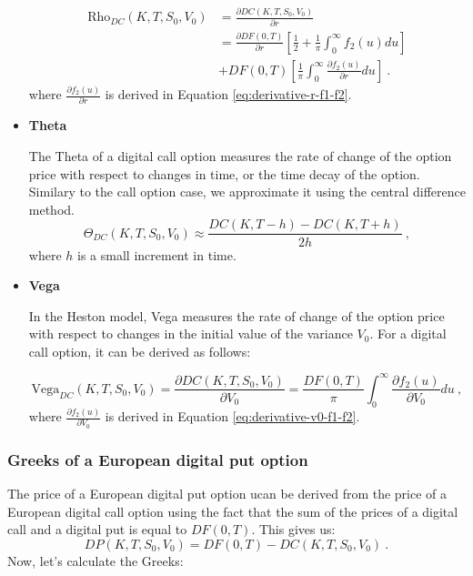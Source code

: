 \begin{itemize}
$$
\begin{aligned}
\text{Rho}_{DC}(K,T,S_0,V_0) &= 
\frac{ \partial DC(K,T, S_0, V_0) }{\partial r} 
\\ &=
\frac{\partial DF(0,T)}{\partial r}  \left[ \frac{1}{2} + \frac{1}{\pi}\int_0^{\infty}f_2(u) du \right]  
\\
&+
 DF(0,T)  \left[\frac{1}{\pi}\int_0^{\infty} \frac{ \partial f_2(u)}{\partial r}  du \right] \ .
\end{aligned}
$$
where $\frac{\partial f_2(u)}{\partial r}$ is derived in Equation \ref{eq:derivative-r-f1-f2}.




\item \textbf{Theta} 

The Theta of a digital call option measures the rate of change of the option price with respect to changes in time, or the time decay of the option. Similary to the call option case, we approximate it using the central difference method. 
$$
 \Theta_{DC}(K,T,S_0,V_0) \approx \frac{DC(K,T-h) - DC(K,T+h)}{2h} \  ,
$$
where $h$ is a small increment in time. 


\item \textbf{Vega} 

In the Heston model, Vega measures the rate of change of the option price with respect to changes in the initial value of the variance $V_0$. For a digital call option, it can be derived as follows:

$$
\text{Vega}_{DC}(K,T,S_0,V_0) = \frac{\partial DC(K,T, S_0, V_0)}{\partial V_0} =  \frac{DF(0,T)  }{\pi}\int_0^{\infty}\frac{\partial f_2(u)}{\partial V_0} du \ ,
$$
where $\frac{\partial f_2(u)}{\partial V_0}$ is derived in Equation \ref{eq:derivative-v0-f1-f2}.


\end{itemize}













\subsubsection{Greeks of a European digital put option}

The price of a European digital put option ucan be derived from the price of a European digital call option using the fact that the sum of the prices of a digital call and a digital put is equal to $DF(0,T)$. This gives us:
$$
DP(K,T, S_0, V_0) = DF(0,T) - DC(K,T,  S_0, V_0) \ .
$$
Now, let's calculate the Greeks:

